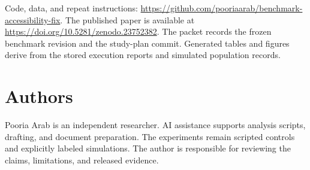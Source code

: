 \documentclass{article}
\begin{document}
Code, data, and repeat instructions: \url{https://github.com/pooriaarab/benchmark-accessibility-fix}. The published paper is available at \url{https://doi.org/10.5281/zenodo.23752382}. The packet records the frozen benchmark revision and the study-plan commit. Generated tables and figures derive from the stored execution reports and simulated population records.


\section{Authors}
Pooria Arab is an independent researcher. AI assistance supports analysis scripts, drafting, and document preparation. The experiments remain scripted controls and explicitly labeled simulations. The author is responsible for reviewing the claims, limitations, and released evidence.



\end{document}
